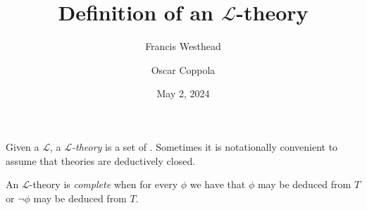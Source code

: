 \documentclass[a4paper]{article}
\title{Definition of an \(\mathcal {L}\)-theory}
\date{May 2, 2024}
\author{Francis Westhead \and Oscar Coppola}
\begin{document}
\maketitle
\par{
    Given a  \(\mathcal {L}\), a \emph{\(\mathcal {L}\)-theory} is a set of .
    Sometimes it is notationally convenient to assume that theories are deductively closed.
}\par{
    An \(\mathcal  L\)-theory is \emph{complete} when for every  \(\phi\) we have that
    \(\phi\) may be deduced from \(T\) or \(\neg \phi\) may be deduced from \(T\).
}
\printbibliography
\end{document}
